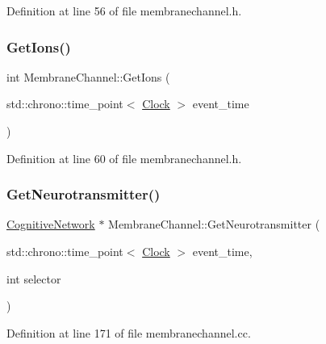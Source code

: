 Definition at line 56 of file membranechannel.\+h.

\mbox{\label{class_membrane_channel_af20c4ca6a3708c86122e7118a29952fd}} 
\subsubsection{\texorpdfstring{Get\+Ions()}{GetIons()}}
{\footnotesize\ttfamily int Membrane\+Channel\+::\+Get\+Ions (\begin{DoxyParamCaption}\item[{std\+::chrono\+::time\+\_\+point$<$ \hyperlink{universe_8h_a0ef8d951d1ca5ab3cfaf7ab4c7a6fd80}{Clock} $>$}]{event\+\_\+time }\end{DoxyParamCaption})\hspace{0.3cm}{\ttfamily [inline]}}



Definition at line 60 of file membranechannel.\+h.

\mbox{\label{class_membrane_channel_a91ce6506a8e82905de7cd031ed5d63f5}} 
\subsubsection{\texorpdfstring{Get\+Neurotransmitter()}{GetNeurotransmitter()}}
{\footnotesize\ttfamily \hyperlink{class_cognitive_network}{Cognitive\+Network} $\ast$ Membrane\+Channel\+::\+Get\+Neurotransmitter (\begin{DoxyParamCaption}\item[{std\+::chrono\+::time\+\_\+point$<$ \hyperlink{universe_8h_a0ef8d951d1ca5ab3cfaf7ab4c7a6fd80}{Clock} $>$}]{event\+\_\+time,  }\item[{int}]{selector }\end{DoxyParamCaption})}



Definition at line 171 of file membranechannel.\+cc.

